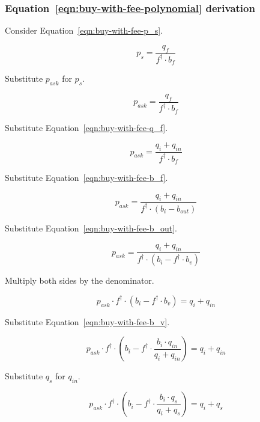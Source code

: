 \subsubsection{Equation~\ref{eqn:buy-with-fee-polynomial} derivation}%
\label{sssec:equation-eqn-buy-with-fee-polynomial-derivation}

Consider Equation~\ref{eqn:buy-with-fee-p_s}.

\begin{equation*}
	p_s = \frac{q_f}{f^{\dagger} \cdot b_f}
\end{equation*}

Substitute $p_{ask}$ for $p_s$.

\begin{equation*}
	p_{ask} = \frac{q_f}{f^{\dagger} \cdot b_f}
\end{equation*}

Substitute Equation~\ref{eqn:buy-with-fee-q_f}.

\begin{equation*}
	p_{ask} = \frac{q_i + q_{in}}{f^{\dagger} \cdot b_f}
\end{equation*}

Substitute Equation~\ref{eqn:buy-with-fee-b_f}.

\begin{equation*}
	p_{ask} = \frac{q_i + q_{in}}{f^{\dagger} \cdot (b_i - b_{out})}
\end{equation*}

Substitute Equation~\ref{eqn:buy-with-fee-b_out}.

\begin{equation*}
	p_{ask} = \frac{q_i + q_{in}}{f^{\dagger} \cdot (b_i - f^{\dagger} \cdot b_v)}
\end{equation*}

Multiply both sides by the denominator.

\begin{equation*}
	p_{ask} \cdot f^{\dagger} \cdot (b_i - f^{\dagger} \cdot b_v) = q_i + q_{in}
\end{equation*}

Substitute Equation~\ref{eqn:buy-with-fee-b_v}.

\begin{equation*}
	p_{ask} \cdot f^{\dagger} \cdot
	\left(b_i - f^{\dagger} \cdot \frac{b_i \cdot q_{in}}{q_i + q_{in}}\right) =
	q_i + q_{in}
\end{equation*}

Substitute $q_s$ for $q_{in}$.

\begin{equation*}
	p_{ask} \cdot f^{\dagger} \cdot
	\left(b_i - f^{\dagger} \cdot \frac{b_i \cdot q_s}{q_i + q_s}\right) = q_i + q_s
\end{equation*}


